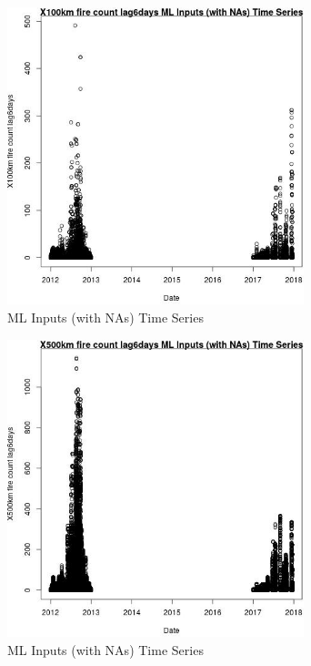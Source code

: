 \begin{figure} 
\centering  
\includegraphics[width=0.77\textwidth]{Code_Outputs/Report_ML_input_PM25_Step4_part_e_de_duplicated_aves_compiled_2019-05-14wNAs_X100km_fire_count_lag6daysvDate.jpg} 
\caption{\label{fig:Report_ML_input_PM25_Step4_part_e_de_duplicated_aves_compiled_2019-05-14wNAsX100km_fire_count_lag6daysvDate}ML Inputs (with NAs) Time Series} 
\end{figure} 
 

\begin{figure} 
\centering  
\includegraphics[width=0.77\textwidth]{Code_Outputs/Report_ML_input_PM25_Step4_part_e_de_duplicated_aves_compiled_2019-05-14wNAs_X500km_fire_count_lag6daysvDate.jpg} 
\caption{\label{fig:Report_ML_input_PM25_Step4_part_e_de_duplicated_aves_compiled_2019-05-14wNAsX500km_fire_count_lag6daysvDate}ML Inputs (with NAs) Time Series} 
\end{figure} 
 

